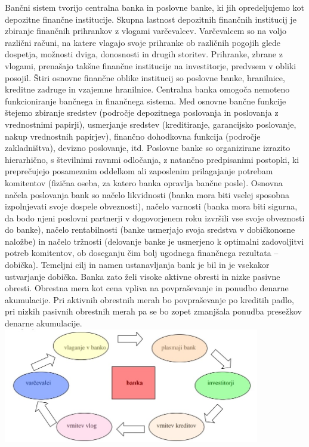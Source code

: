 \documentclass[letterpaper, titlepage, freqn]{article}
\begin{document}
Bančni sistem tvorijo centralna banka in poslovne banke, ki jih opredeljujemo kot depozitne finančne institucije. Skupna lastnost depozitnih finančnih institucij je zbiranje finančnih prihrankov z vlogami varčevalcev. Varčevalcem so na voljo različni računi, na katere vlagajo svoje prihranke ob različnih pogojih glede dospetja, možnosti dviga, donosnosti in drugih storitev. Prihranke, zbrane z vlogami, prenašajo takšne finančne institucije na investitorje, predvsem v obliki posojil. Štiri osnovne finančne oblike institucij so poslovne banke, hranilnice, kreditne zadruge in vzajemne hranilnice.
Centralna banka omogoča nemoteno funkcioniranje bančnega in finančnega sistema.
Med osnovne bančne funkcije štejemo zbiranje sredstev (področje depozitnega poslovanja in poslovanja z vrednostnimi papirji), usmerjanje sredstev (kreditiranje, garancijsko poslovanje, nakup vrednostnih papirjev), finančno dohodkovna funkcija (področje zakladništva), devizno poslovanje, itd.
Poslovne banke so organizirane izrazito hierarhično, s številnimi ravnmi odločanja, z natančno predpisanimi postopki, ki preprečujejo posameznim oddelkom ali zaposlenim prilagajanje potrebam komitentov (fizična oseba, za katero banka opravlja bančne posle).
Osnovna načela poslovanja bank so načelo likvidnosti (banka mora biti vselej sposobna izpolnjevati svoje dospele obveznosti), načelo varnosti (banka mora biti sigurna, da bodo njeni poslovni partnerji v dogovorjenem roku izvršili vse svoje obveznosti do banke), načelo rentabilnosti (banke usmerjajo svoja sredstva v dobičkonosne naložbe) in načelo tržnosti (delovanje banke je usmerjeno k optimalni zadovoljitvi potreb komitentov, ob doseganju čim bolj ugodnega finančnega rezultata – dobička).
Temeljni cilj in namen ustanavljanja bank je bil in je vsekakor ustvarjanje dobička. Banka zato želi visoke aktivne obresti in nizke pasivne obresti. Obrestna mera kot cena vpliva na povpraševanje in ponudbo denarne akumulacije. Pri aktivnih obrestnih merah bo povpraševanje po kreditih padlo, pri nizkih pasivnih obrestnih merah pa se bo zopet zmanjšala ponudba presežkov denarne akumulacije.\\

\includegraphics[height=5cm]{tokokrog_sredstev}\\
\end{document}
